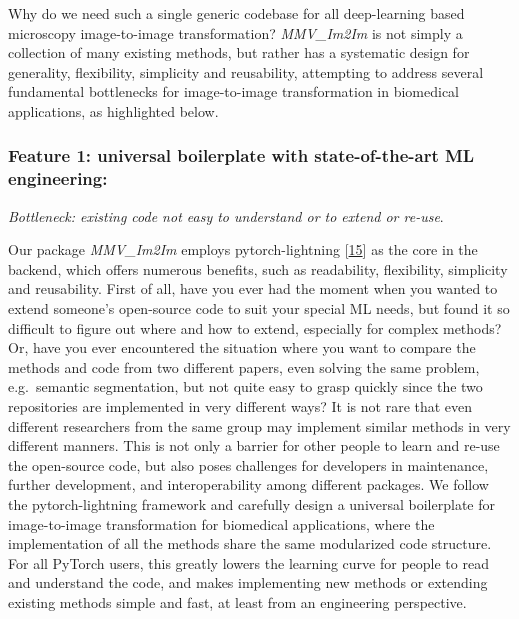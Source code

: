 Why do we need such a single generic codebase for all deep-learning based microscopy image-to-image transformation? \emph{MMV\_Im2Im} is not simply a collection of many existing methods, but rather has a systematic design for generality, flexibility, simplicity and reusability, attempting to address several fundamental bottlenecks for image-to-image transformation in biomedical applications, as highlighted below.

\hypertarget{feature-1-universal-boilerplate-with-state-of-the-art-ml-engineering}{%
\subsubsection{Feature 1: universal boilerplate with state-of-the-art ML engineering:}\label{feature-1-universal-boilerplate-with-state-of-the-art-ml-engineering}}

\emph{Bottleneck: existing code not easy to understand or to extend or re-use}.

Our package \emph{MMV\_Im2Im} employs pytorch-lightning {[}\protect\hyperlink{ref-YbvSvdyB}{15}{]} as the core in the backend, which offers numerous benefits, such as readability, flexibility, simplicity and reusability. First of all, have you ever had the moment when you wanted to extend someone's open-source code to suit your special ML needs, but found it so difficult to figure out where and how to extend, especially for complex methods? Or, have you ever encountered the situation where you want to compare the methods and code from two different papers, even solving the same problem, e.g.~semantic segmentation, but not quite easy to grasp quickly since the two repositories are implemented in very different ways? It is not rare that even different researchers from the same group may implement similar methods in very different manners. This is not only a barrier for other people to learn and re-use the open-source code, but also poses challenges for developers in maintenance, further development, and interoperability among different packages. We follow the pytorch-lightning framework and carefully design a universal boilerplate for image-to-image transformation for biomedical applications, where the implementation of all the methods share the same modularized code structure. For all PyTorch users, this greatly lowers the learning curve for people to read and understand the code, and makes implementing new methods or extending existing methods simple and fast, at least from an engineering perspective.

